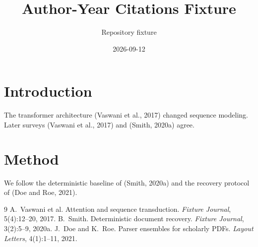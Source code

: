 \documentclass[11pt,a4paper]{article}
\title{Author-Year Citations Fixture}
\author{Repository fixture}
\date{2026-09-12}%
\begin{document}
\maketitle

\section{Introduction}
The transformer architecture (Vaswani et al., 2017) changed sequence
modeling. Later surveys (Vaswani et al., 2017) and (Smith, 2020a) agree.

\section{Method}
We follow the deterministic baseline of (Smith, 2020a) and the recovery
protocol of (Doe and Roe, 2021).

\begin{thebibliography}{9}
  A.~Vaswani et al.
  Attention and sequence transduction.
  \emph{Fixture Journal}, 5(4):12--20, 2017.
  B.~Smith.
  Deterministic document recovery.
  \emph{Fixture Journal}, 3(2):5--9, 2020a.
  J.~Doe and K.~Roe.
  Parser ensembles for scholarly PDFs.
  \emph{Layout Letters}, 4(1):1--11, 2021.
\end{thebibliography}
\end{document}
